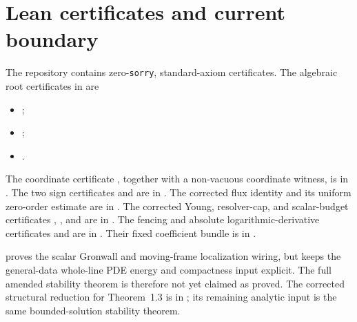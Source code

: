 \documentclass[11pt]{article}
\begin{document}
\section{Lean certificates and current boundary}

The repository contains zero-\texttt{sorry}, standard-axiom certificates.
The algebraic root certificates in
 are
\begin{itemize}[leftmargin=2em]
\item {};
\item {};
\item {}.
\end{itemize}
The coordinate certificate
, together with a
non-vacuous coordinate witness, is in
.  The two sign
certificates
 and
 are in
.
The corrected flux identity
 and its uniform
zero-order estimate
 are in
.
The corrected Young, resolver-cap, and scalar-budget certificates
,
, and
 are in
.
The fencing and absolute logarithmic-derivative certificates
 and
 are in
.  Their fixed coefficient
bundle  is in
.

 proves the scalar Gronwall and
moving-frame localization wiring, but keeps the general-data whole-line PDE
energy and compactness input explicit.  The full amended stability theorem is
therefore not yet claimed as proved.  The corrected structural reduction for
Theorem~1.3 is in
; its remaining analytic input
is the same bounded-solution stability theorem.
\end{document}
